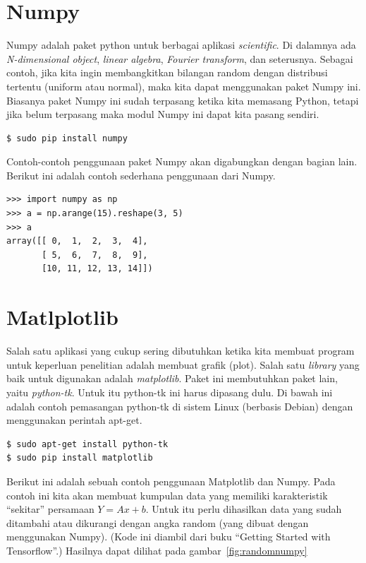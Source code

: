 \section{Numpy}
Numpy adalah paket python untuk berbagai aplikasi {\em scientific}.
Di dalamnya ada {\em N-dimensional object}, {\em linear algebra},
{\em Fourier transform}, dan seterusnya.
Sebagai contoh, jika kita ingin membangkitkan bilangan random dengan 
distribusi tertentu (uniform atau normal), maka kita dapat menggunakan 
paket Numpy ini.
Biasanya paket Numpy ini sudah terpasang ketika kita memasang Python,
tetapi jika belum terpasang maka modul Numpy ini dapat kita pasang sendiri.

\begin{verbatim}
$ sudo pip install numpy
\end{verbatim}

Contoh-contoh penggunaan paket Numpy akan digabungkan dengan bagian lain.
Berikut ini adalah contoh sederhana penggunaan dari Numpy.

\begin{verbatim}
>>> import numpy as np
>>> a = np.arange(15).reshape(3, 5)
>>> a
array([[ 0,  1,  2,  3,  4],
       [ 5,  6,  7,  8,  9],
       [10, 11, 12, 13, 14]])
\end{verbatim}

\section{Matlplotlib}
Salah satu aplikasi yang cukup sering dibutuhkan ketika kita membuat program 
untuk keperluan penelitian adalah membuat grafik (plot). 
Salah satu {\em library} yang baik untuk digunakan adalah {\em matplotlib}. 
Paket ini membutuhkan paket lain, yaitu {\em python-tk}. 
Untuk itu python-tk ini harus dipasang dulu. 
Di bawah ini adalah contoh pemasangan python-tk di sistem Linux (berbasis Debian) 
dengan menggunakan perintah apt-get.

\begin{verbatim}
$ sudo apt-get install python-tk
$ sudo pip install matplotlib
\end{verbatim}

Berikut ini adalah sebuah contoh penggunaan Matplotlib dan Numpy. Pada contoh ini kita akan membuat kumpulan data yang memiliki karakteristik ``sekitar'' persamaan 
$Y = Ax + b$.
Untuk itu perlu dihasilkan data yang sudah ditambahi atau dikurangi dengan angka random (yang dibuat dengan menggunakan Numpy). (Kode ini diambil dari buku ``Getting Started with Tensorflow''\cite{tensorflowstarted}.)
Hasilnya dapat dilihat pada gambar~\ref{fig:randomnumpy}


